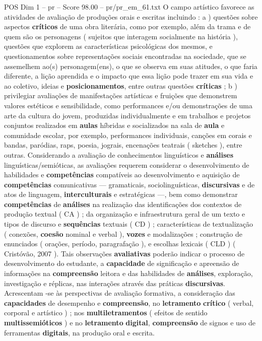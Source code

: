 \begin{textsample}{POS Dim 1 – pr – Score 98.00 – pr/pr\_em\_61.txt}
O campo artístico favorece as atividades de avaliação de produções orais e escritas incluindo : a ) questões sobre aspectos \textbf{críticos} de uma obra literária, como por exemplo, além da trama e de quem são os personagens ( sujeitos que interagem socialmente na história ), questões que explorem as características psicológicas dos mesmos, e questionamentos sobre representações sociais encontradas na sociedade, que se assemelhem ao(s) personagem(ens), o que se observa em suas atitudes, o que faria diferente, a lição aprendida e o impacto que essa lição pode trazer em sua vida e ao coletivo, ideias e \textbf{posicionamentos}, entre outras questões \textbf{críticas} ; b ) privilegiar avaliações de manifestações artísticas e fruições que demonstrem valores estéticos e sensibilidade, como performances e/ou demonstrações de uma arte da cultura do jovem, produzidas individualmente e em trabalhos e projetos conjuntos realizados em \textbf{aulas} híbridas e socializados na sala de \textbf{aula} e comunidade escolar, por exemplo, performances individuais, canções em corais e bandas, paródias, raps, poesia, jograis, encenações teatrais ( sketches ), entre outras.
Considerando a avaliação de conhecimentos linguísticos e \textbf{análises} linguísticas/semióticas, as avaliações requerem considerar o desenvolvimento de habilidades e \textbf{competências} compatíveis ao desenvolvimento e aquisição de \textbf{competências} comunicativas — gramaticais, sociolinguísticas, \textbf{discursivas} e de atos de linguagem, \textbf{interculturais} e estratégicas —, bem como demonstrar \textbf{competências} de \textbf{análises} na realização das identificações dos contextos de produção textual ( CA ) ; da organização e infraestrutura geral de um texto e tipos de discurso e \textbf{sequências} textuais ( CD ) ; características de textualização ( conexões, \textbf{coesão} nominal e verbal ), \textbf{vozes} e modalizações ; construção de enunciados ( orações, período, paragrafação ), e escolhas lexicais ( CLD ) ( Cristóvão, 2007 ).
Tais observações \textbf{avaliativas} poderão indicar o processo de desenvolvimento do estudante, a \textbf{capacidade} de significação e apreensão de informações na \textbf{compreensão} leitora e das habilidades de \textbf{análises}, exploração, investigação e réplicas, nas interações através das práticas \textbf{discursivas}.
Acrescentam -se às perspectivas de avaliação formativa, a consideração das \textbf{capacidades} de desempenho e \textbf{compreensão}, no \textbf{letramento} \textbf{crítico} ( verbal, corporal e artístico ) ; nos \textbf{multiletramentos} ( efeitos de sentido \textbf{multissemióticos} ) e no \textbf{letramento} \textbf{digital}, \textbf{compreensão} de signos e uso de ferramentas \textbf{digitais}, na produção oral e escrita.

\end{textsample}
